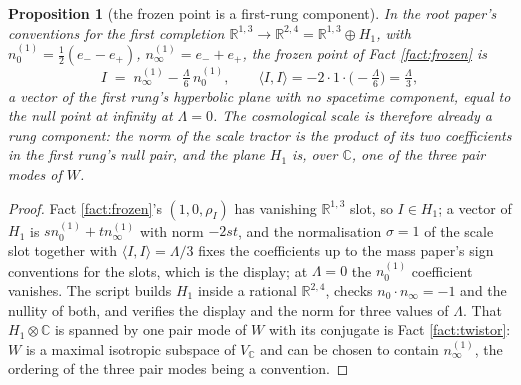 \documentclass[11pt]{article}
\newtheorem{proposition}[theorem]{Proposition}
\theoremstyle{definition}
\newcommand{\R}{\mathbb{R}}
\newcommand{\C}{\mathbb{C}}
\newcommand{\ip}[2]{\langle #1, #2\rangle}
\newcommand{\nO}{n_{0}}
\newcommand{\nInf}{n_{\infty}}
\begin{document}
\begin{proposition}[the frozen point is a first-rung component]\label{prop:firstrung}
In the root paper's conventions for the first completion $\R^{1,3} \to \R^{2,4} = \R^{1,3} \oplus H_{1}$, with $\nO^{(1)} = \tfrac12(e_{-} - e_{+})$, $\nInf^{(1)} = e_{-} + e_{+}$, the frozen point of Fact \ref{fact:frozen} is
\[
I \;=\; \nInf^{(1)} - \tfrac{\Lambda}{6}\,\nO^{(1)}, \qquad \ip{I}{I} = -2 \cdot 1 \cdot \bigl(-\tfrac{\Lambda}{6}\bigr) = \tfrac{\Lambda}{3},
\]
a vector of the first rung's hyperbolic plane with no spacetime component, equal to the null point at infinity at $\Lambda = 0$. The cosmological scale is therefore already a rung component: the norm of the scale tractor is the product of its two coefficients in the first rung's null pair, and the plane $H_{1}$ is, over $\C$, one of the three pair modes of $W$.
\end{proposition}

\begin{proof}
Fact \ref{fact:frozen}'s $(1, 0, \rho_{I})$ has vanishing $\R^{1,3}$ slot, so $I \in H_{1}$; a vector of $H_{1}$ is $s\nO^{(1)} + t\nInf^{(1)}$ with norm $-2st$, and the normalisation $\sigma = 1$ of the scale slot together with $\ip{I}{I} = \Lambda/3$ fixes the coefficients up to the mass paper's sign conventions for the slots, which is the display; at $\Lambda = 0$ the $\nO^{(1)}$ coefficient vanishes. The script builds $H_{1}$ inside a rational $\R^{2,4}$, checks $\nO \cdot \nInf = -1$ and the nullity of both, and verifies the display and the norm for three values of $\Lambda$. That $H_{1} \otimes \C$ is spanned by one pair mode of $W$ with its conjugate is Fact \ref{fact:twistor}: $W$ is a maximal isotropic subspace of $V_{\C}$ and can be chosen to contain $\nInf^{(1)}$, the ordering of the three pair modes being a convention.
\end{proof}
\end{document}
